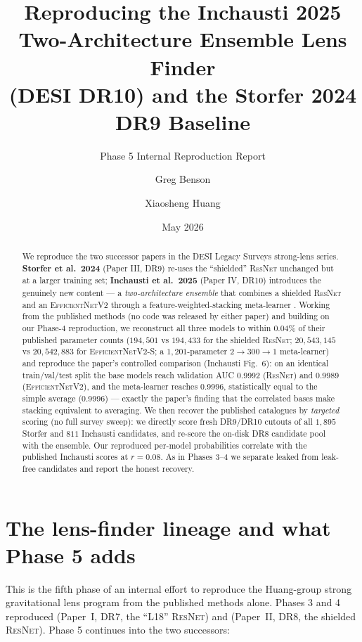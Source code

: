 \documentclass[11pt,letterpaper]{article}
\title{Reproducing the Inchausti 2025 Two-Architecture Ensemble Lens Finder\\
       (DESI DR10) and the Storfer 2024 DR9 Baseline}
\author{Greg Benson \and Xiaosheng Huang}
\date{May 2026}
\newcommand{\ResNet}{\textsc{ResNet}}
\newcommand{\EffNet}{\textsc{EfficientNetV2}}
\newcommand{\rResnetVal}{0.9992}     %
\newcommand{\rEffVal}{0.9989}        %
\newcommand{\rMetaVal}{0.9996}       %
\newcommand{\rAvgVal}{0.9996}        %
\newcommand{\rInchaustiCorr}{0.08}   %
\begin{document}
\maketitle
\subtitle{Phase 5 Internal Reproduction Report}

\begin{abstract}
We reproduce the two successor papers in the DESI Legacy Surveys strong-lens
series. \textbf{Storfer et al.\ 2024} (Paper III, DR9) re-uses the
\citet{huang2021desi} ``shielded'' \ResNet{} unchanged but at a larger training
set; \textbf{Inchausti et al.\ 2025} (Paper IV, DR10) introduces the genuinely
new content --- a \emph{two-architecture ensemble} that combines a shielded
\ResNet{} and an \EffNet{} through a feature-weighted-stacking meta-learner
\citep{coscrato2020nnstacking}. Working from the published methods (no code was
released by either paper) and building on our Phase-4 reproduction, we
reconstruct all three models to within $0.04\%$ of their published parameter
counts ($194{,}501$ vs $194{,}433$ for the shielded \ResNet{}; $20{,}543{,}145$
vs $20{,}542{,}883$ for \EffNet{}-S; a $1{,}201$-parameter $2\!\to\!300\!\to\!1$
meta-learner) and reproduce the paper's controlled comparison
(Inchausti Fig.~6): on an identical train/val/test split the base models reach
validation AUC \rResnetVal{} (\ResNet) and \rEffVal{} (\EffNet), and the
meta-learner reaches \rMetaVal{}, statistically equal to the simple average
(\rAvgVal{}) --- exactly the paper's finding that the correlated bases make
stacking equivalent to averaging. We then recover the published catalogues by
\emph{targeted} scoring (no full survey sweep): we directly score fresh DR9/DR10
cutouts of all $1{,}895$ Storfer and $811$ Inchausti candidates, and re-score the
on-disk DR8 candidate pool with the ensemble. Our reproduced per-model
probabilities correlate with the published Inchausti scores at
$r=\rInchaustiCorr{}$. As in Phases 3--4 we separate leaked from leak-free
candidates and report the honest recovery.
\end{abstract}

\tableofcontents

\section{The lens-finder lineage and what Phase 5 adds}

This is the fifth phase of an internal effort to reproduce the Huang-group strong
gravitational lens program from the published methods alone. Phases 3 and 4
reproduced \citet{huang2020decals} (Paper~I, DR7, the \citet{lanusse2018cmu}
``L18'' \ResNet) and \citet{huang2021desi} (Paper~II, DR8, the shielded \ResNet).
Phase 5 continues into the two successors:
\end{document}

